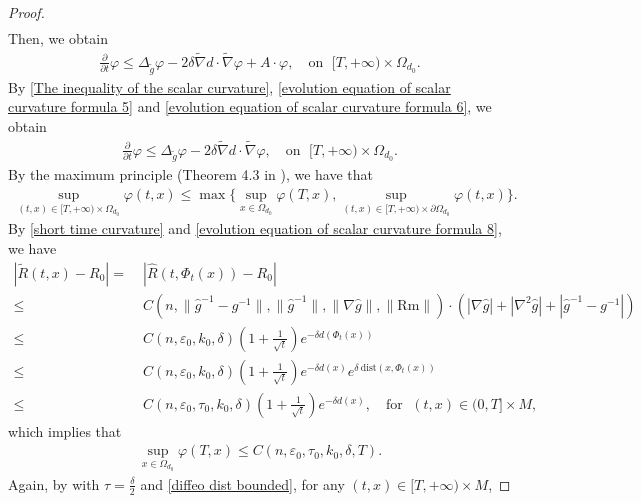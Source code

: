 \documentclass[12pt]{amsart}
\begin{document}
\begin{proof}
\begin{equation}
\begin{split}
    \end{split}
\end{equation}
Then, we obtain
\begin{align}\label{evolution equation of scalar curvature formula 6}
    \frac{\partial}{\partial t} \varphi \leq \Delta_{\tilde{g}}\varphi - 2\delta \tilde{\nabla} d\cdot \tilde{\nabla}\varphi + A\cdot\varphi,\quad \text{on }\; [T, +\infty)\times \Omega_{d_0}. 
\end{align}
By \eqref{The inequality of the scalar curvature}, \eqref{evolution equation of scalar curvature formula 5} and \eqref{evolution equation of scalar curvature formula 6}, we obtain
\begin{align}
    \frac{\partial}{\partial t} \varphi \leq \Delta_{\tilde{g}}\varphi - 2\delta \tilde{\nabla} d \cdot \tilde{\nabla} \varphi,\quad \text{on }\; [T, +\infty)\times \Omega_{d_0}.
\end{align}
By the maximum principle (Theorem 4.3 in \cite{QSW2013}), we have that 
\begin{align}\label{scalar curvature long time part 1}
    \sup_{(t, x)\in [T, +\infty)\times \Omega_{d_0}}\varphi(t, x) \leq \max\Big\{\sup_{x\in \Omega_{d_0}}\varphi(T, x), \sup_{(t, x)\in [T, +\infty)\times\partial\Omega_{d_0}}\varphi(t, x)\Big\}.
\end{align}
By \eqref{short time curvature} and \eqref{evolution equation of scalar curvature formula 8}, we have
\begin{align*}
    |\tilde{R}(t, x) - R_0| =&\; |\hat{R}(t, \Phi_t(x)) - R_0|\\
    \leq&\;  C(n, \|\hat{g}^{-1} - g^{-1}\|, \|\hat{g}^{-1}\|, \|\nabla\hat{g}\|, \|\mathrm{Rm}\|)\cdot (|\nabla\hat{g}| + |\nabla^2 \hat{g}| + |\hat{g}^{-1} - g^{-1}|)\\
    \leq&\; C(n, \varepsilon_0, k_0, \delta)(1 + \frac{1}{\sqrt{t}}) e^{-\delta d(\Phi_t(x))}\\
    \leq&\; C(n, \varepsilon_0, k_0, \delta) (1 + \frac{1}{\sqrt{t}}) e^{-\delta d(x)} e^{\delta\ \mathrm{dist}(x, \Phi_{t}(x))}\\
    \leq&\; C(n,\varepsilon_0,\tau_0, k_0, \delta) (1 + \frac{1}{\sqrt{t}}) e^{-\delta d(x)},\quad \text{for }\; (t, x)\in (0, T]\times M,
\end{align*}
which implies that 
\begin{align}\label{scalar curvature long time part 2}
    \sup_{x\in \Omega_{d_0}}\varphi(T, x) \leq C(n,\varepsilon_0,\tau_0, k_0, \delta, T).
\end{align}
Again, by  with $\tau = \frac{\delta}{2}$ and \eqref{diffeo dist bounded}, for any $(t, x)\in [T, +\infty)\times M$,

\end{proof}
\end{document}
